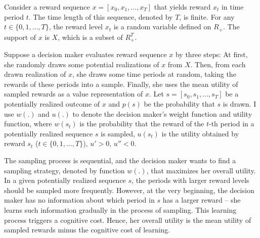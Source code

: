 \documentclass[
  12pt,
]{article}
\begin{document}
Consider a reward sequence \(x = [x_0,x_1,...,x_T]\) that yields reward
\(x_t\) in time period \(t\). The time length of this sequence, denoted
by \(T\), is finite. For any \(t \in \{0,1,...,T\}\), the reward level
\(x_t\) is a random variable defined on \(R_{+}\). The support of \(x\)
is \(X\), which is a subset of \(R_{+}^T\).

Suppose a decision maker evaluates reward sequence \(x\) by three steps:
At first, she randomly draws some potential realizations of \(x\) from
\(X\). Then, from each drawn realization of \(x\), she draws some time
periods at random, taking the rewards of these periods into a sample.
Finally, she uses the mean utility of sampled rewards as a value
representation of \(x\). Let \(s=[s_0,s_1,...,s_T]\) be a potentially
realized outcome of \(x\) and \(p(s)\) be the probability that \(s\) is
drawn. I use \(w(.)\) and \(u(.)\) to denote the decision maker's weight
function and utility function, where \(w(s_t)\) is the probability that
the reward of the \(t\)-th period in a potentially realized sequence
\(s\) is sampled, \(u(s_t)\) is the utility obtained by reward \(s_t\)
(\(t \in \{0,1,...,T\}\)), \(u'>0\), \(u''<0\).

The sampling process is sequential, and the decision maker wants to find
a sampling strategy, denoted by function \(w(.)\), that maximizes her
overall utility. In a given potentially realized sequence \(s\), the
periods with larger reward levels should be sampled more frequently.
However, at the very beginning, the decision maker has no information
about which period in \(s\) has a larger reward -- she learns such
information gradually in the process of sampling. This learning process
triggers a cognitive cost. Hence, her overall utility is the mean
utility of sampled rewards minus the cognitive cost of learning.
\end{document}
